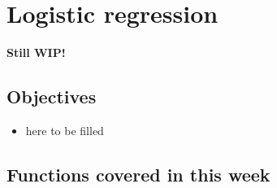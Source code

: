 \documentclass[
]{book}
\providecommand{\tightlist}{%
  \setlength{\itemsep}{0pt}\setlength{\parskip}{0pt}}
\begin{document}
\hypertarget{log-est}{%
\chapter{Logistic regression}\label{log-est}}

\textbf{Still WIP!}

\hypertarget{objectives-8}{%
\section{Objectives}\label{objectives-8}}

\begin{itemize}
\tightlist
\item
  here to be filled
\end{itemize}

\hypertarget{functions-covered-in-this-week}{%
\section{Functions covered in this week}\label{functions-covered-in-this-week}}
\end{document}
